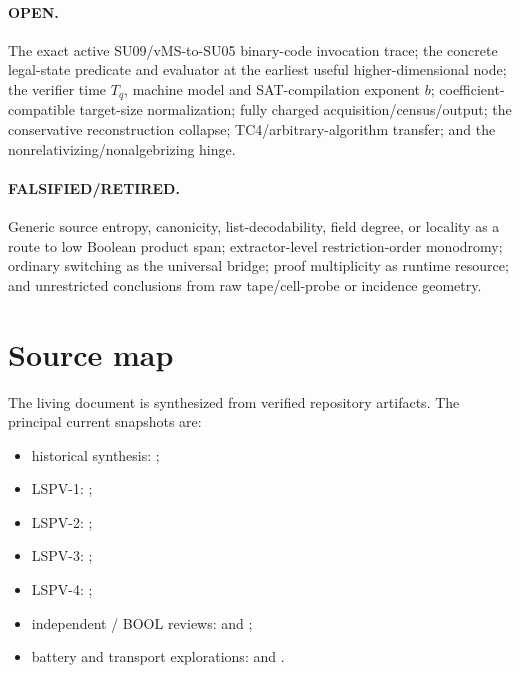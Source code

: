 \documentclass[11pt]{article}
\begin{document}
\paragraph{OPEN.}
The exact active SU09/vMS-to-SU05 binary-code invocation trace; the concrete
legal-state predicate and evaluator at the earliest useful
higher-dimensional node; the verifier time \(T_q\), machine model and
SAT-compilation exponent \(b\); coefficient-compatible target-size
normalization; fully charged acquisition/census/output; the conservative
reconstruction collapse; TC4/arbitrary-algorithm transfer; and the
nonrelativizing/nonalgebrizing hinge.

\paragraph{FALSIFIED/RETIRED.}
Generic source entropy, canonicity, list-decodability, field degree, or
locality as a route to low Boolean product span; extractor-level
restriction-order monodromy; ordinary switching as the universal bridge;
proof multiplicity as runtime resource; and unrestricted conclusions from
raw tape/cell-probe or incidence geometry.




\section{Source map}

The living document is synthesized from verified repository artifacts. The principal current
snapshots are:

\begin{itemize}
  \item historical synthesis:
    ;
  \item LSPV-1:
    ;
  \item LSPV-2:
    ;
  \item LSPV-3:
    ;
  \item LSPV-4:
    ;
  \item independent / BOOL reviews:
     and ;
  \item battery and transport explorations:
     and
    .
\end{itemize}
\end{document}
